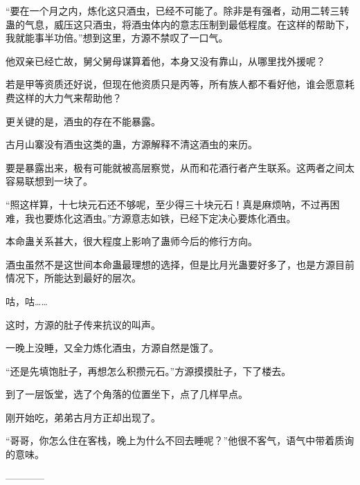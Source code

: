 \begin{this_body}
“要在一个月之内，炼化这只酒虫，已经不可能了。除非是有强者，动用二转三转蛊的气息，威压这只酒虫，将酒虫体内的意志压制到最低程度。在这样的帮助下，我就能事半功倍。”想到这里，方源不禁叹了一口气。

他双亲已经亡故，舅父舅母谋算着他，本身又没有靠山，从哪里找外援呢？

若是甲等资质还好说，但现在他资质只是丙等，所有族人都不看好他，谁会愿意耗费这样的大力气来帮助他？

更关键的是，酒虫的存在不能暴露。

古月山寨没有酒虫这类的蛊，方源解释不清这酒虫的来历。

要是暴露出来，极有可能就被高层察觉，从而和花酒行者产生联系。这两者之间太容易联想到一块了。

“照这样算，十七块元石还不够呢，至少得三十块元石！真是麻烦呐，不过再困难，我也要炼化这酒虫。”方源意志如铁，已经下定决心要炼化酒虫。

本命蛊关系甚大，很大程度上影响了蛊师今后的修行方向。

酒虫虽然不是这世间本命蛊最理想的选择，但是比月光蛊要好多了，也是方源目前情况下，所能达到最好的层次。

咕，咕……

这时，方源的肚子传来抗议的叫声。

一晚上没睡，又全力炼化酒虫，方源自然是饿了。

“还是先填饱肚子，再想怎么积攒元石。”方源摸摸肚子，下了楼去。

到了一层饭堂，选了个角落的位置坐下，点了几样早点。

刚开始吃，弟弟古月方正却出现了。

“哥哥，你怎么住在客栈，晚上为什么不回去睡呢？”他很不客气，语气中带着质询的意味。

------------

\end{this_body}

